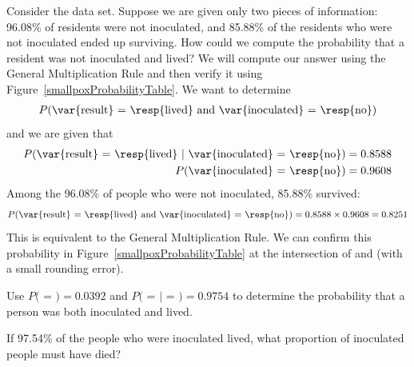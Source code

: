 \begin{examplewrap}
\begin{nexample}{Consider the  data set. Suppose we are given only two pieces of information: 96.08\% of residents were not inoculated, and 85.88\% of the residents who were not inoculated ended up surviving. How could we compute the probability that a resident was not inoculated and lived?}
We will compute our answer using the General Multiplication Rule and then verify it using Figure~\ref{smallpoxProbabilityTable}. We want to determine
\begin{eqnarray*}
P(\text{\var{result} = \resp{lived} and \var{inoculated} = \resp{no}})
\end{eqnarray*}
and we are given that
\begin{eqnarray*}
P(\text{\var{result} = \resp{lived} }|\text{ \var{inoculated} = \resp{no}})=0.8588 \\
P(\text{\var{inoculated} = \resp{no}})=0.9608
\end{eqnarray*}
Among the 96.08\% of people who were not inoculated, 85.88\% survived:
\begin{eqnarray*}
P(\text{\var{result} = \resp{lived} and \var{inoculated} = \resp{no}}) = 0.8588\times 0.9608 = 0.8251
\end{eqnarray*}
This is equivalent to the General Multiplication Rule. We can confirm this probability in Figure~\ref{smallpoxProbabilityTable} at the intersection of  and  (with a small rounding error).
\end{nexample}
\end{examplewrap}

\begin{exercisewrap}
\begin{nexercise}
Use $P($ = $) = 0.0392$ and $P($ =  $|$  = $) = 0.9754$ to determine the probability that a person was both inoculated and lived.\footnotemark
\end{nexercise}
\end{exercisewrap}

\begin{exercisewrap}
\begin{nexercise}
If 97.54\% of the people who were inoculated lived, what proportion of inoculated people must have died?\footnotemark
\end{nexercise}
\end{exercisewrap}

